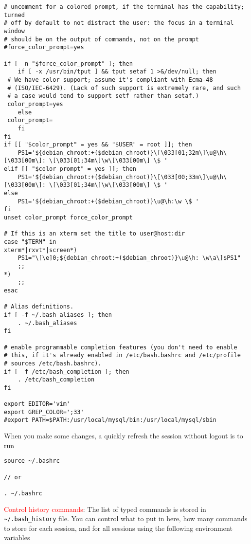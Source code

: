 {\begin{verbatim}
# uncomment for a colored prompt, if the terminal has the capability; turned
# off by default to not distract the user: the focus in a terminal window
# should be on the output of commands, not on the prompt
#force_color_prompt=yes

if [ -n "$force_color_prompt" ]; then
    if [ -x /usr/bin/tput ] && tput setaf 1 >&/dev/null; then
 # We have color support; assume it's compliant with Ecma-48
 # (ISO/IEC-6429). (Lack of such support is extremely rare, and such
 # a case would tend to support setf rather than setaf.)
 color_prompt=yes
    else
 color_prompt=
    fi
fi
if [[ "$color_prompt" = yes && "$USER" = root ]]; then
    PS1='${debian_chroot:+($debian_chroot)}\[\033[01;32m\]\u@\h\[\033[00m\]: \[\033[01;34m\]\w\[\033[00m\] \$ '
elif [[ "$color_prompt" = yes ]]; then
    PS1='${debian_chroot:+($debian_chroot)}\[\033[00;33m\]\u@\h\[\033[00m\]: \[\033[01;34m\]\w\[\033[00m\] \$ '
else
    PS1='${debian_chroot:+($debian_chroot)}\u@\h:\w \$ '
fi
unset color_prompt force_color_prompt

# If this is an xterm set the title to user@host:dir
case "$TERM" in
xterm*|rxvt*|screen*)
    PS1="\[\e]0;${debian_chroot:+($debian_chroot)}\u@\h: \w\a\]$PS1"
    ;;
*)
    ;;
esac

# Alias definitions.
if [ -f ~/.bash_aliases ]; then
    . ~/.bash_aliases
fi

# enable programmable completion features (you don't need to enable
# this, if it's already enabled in /etc/bash.bashrc and /etc/profile
# sources /etc/bash.bashrc).
if [ -f /etc/bash_completion ]; then
    . /etc/bash_completion
fi

export EDITOR='vim'
export GREP_COLOR=';33'
#export PATH=$PATH:/usr/local/mysql/bin:/usr/local/mysql/sbin
\end{verbatim}

When you make some changes, a quickly refresh the session without logout is to
run
\begin{verbatim}
source ~/.bashrc

// or

. ~/.bashrc
\end{verbatim}
}

\textcolor{red}{Control history commands}: The list of typed commands is stored
in \verb!~/.bash_history! file. You can control what to put in here, how many
commands to store for each session, and for all sessions using the following
environment variables

